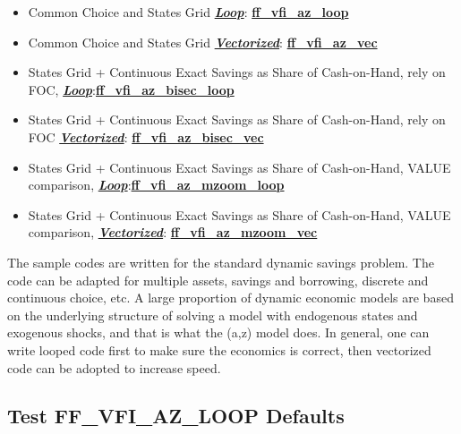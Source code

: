 \documentclass[
]{book}
\begin{document}
\begin{itemize}
\item
  Common Choice and States Grid \underline{\textbf{\emph{Loop}}}:
  \href{https://github.com/FanWangEcon/MEconTools/blob/master/MEconTools/vfi/ff_vfi_az_loop.m}{\textbf{ff\_vfi\_az\_loop}}
\item
  Common Choice and States Grid \underline{\textbf{\emph{Vectorized}}}:
  \href{https://github.com/FanWangEcon/MEconTools/blob/master/MEconTools/vfi/ff_vfi_az_vec.m}{\textbf{ff\_vfi\_az\_vec}}
\item
  States Grid + Continuous Exact Savings as Share of Cash-on-Hand,
  rely on FOC, \underline{\textbf{\emph{Loop}}}:\href{https://github.com/FanWangEcon/MEconTools/blob/master/MEconTools/vfi/ff_vfi_az_bisec_loop.m}{\textbf{ff\_vfi\_az\_bisec\_loop}}
\item
  States Grid + Continuous Exact Savings as Share of Cash-on-Hand,
  rely on FOC \underline{\textbf{\emph{Vectorized}}}:
  \href{https://github.com/FanWangEcon/MEconTools/blob/master/MEconTools/vfi/ff_vfi_az_bisec_vec.m}{\textbf{ff\_vfi\_az\_bisec\_vec}}
\item
  States Grid + Continuous Exact Savings as Share of Cash-on-Hand,
  VALUE comparison, \underline{\textbf{\emph{Loop}}}:\href{https://github.com/FanWangEcon/MEconTools/blob/master/MEconTools/vfi/ff_vfi_az_mzoom_loop.m}{\textbf{ff\_vfi\_az\_mzoom\_loop}}
\item
  States Grid + Continuous Exact Savings as Share of Cash-on-Hand,
  VALUE comparison, \underline{\textbf{\emph{Vectorized}}}:
  \href{https://github.com/FanWangEcon/MEconTools/blob/master/MEconTools/vfi/ff_vfi_az_mzoom_vec.m}{\textbf{ff\_vfi\_az\_mzoom\_vec}}
\end{itemize}

The sample codes are written for the standard dynamic savings problem.
The code can be adapted for multiple assets, savings and borrowing,
discrete and continuous choice, etc. A large proportion of dynamic
economic models are based on the underlying structure of solving a model
with endogenous states and exogenous shocks, and that is what the (a,z)
model does. In general, one can write looped code first to make sure the
economics is correct, then vectorized code can be adopted to increase
speed.

\hypertarget{test-ff_vfi_az_loop-defaults}{%
\subsection{Test FF\_VFI\_AZ\_LOOP Defaults}\label{test-ff_vfi_az_loop-defaults}}
\end{document}
